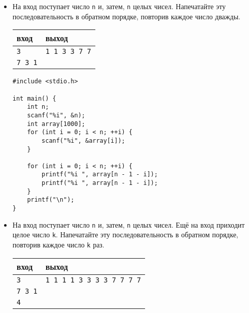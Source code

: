 \documentclass{article}
\begin{document}
\begin{itemize}
\begin{lstlisting}[backgroundcolor = \color{solcolor}]
#include <stdio.h>

int main() {
    int n;
    scanf("%i", &n);
    int array[1000];
    for (int i = 0; i < n; ++i) {
        scanf("%i", &array[i]);
    }
    
    for (int i = 0; i < n; ++i) {
        printf("%i ", array[i]);
    }
    for (int i = 0; i < n; ++i) {
        printf("%i ", array[n - 1 - i]);
    }
    printf("\n");
}
\end{lstlisting}

\item На вход поступает число \texttt{n} и, затем, \texttt{n} целых чисел. Напечатайте эту последовательность в обратном порядке, повторив каждое число дважды.
\begin{center}
\begin{tabular}{ l | l }
 вход & выход \\ \hline
 \texttt{3} & \texttt{1 1 3 3 7 7}  \\ 
 \texttt{7 3 1} &  \\ 
\end{tabular}
\end{center}

\begin{lstlisting}[backgroundcolor = \color{solcolor}]
#include <stdio.h>

int main() {
    int n;
    scanf("%i", &n);
    int array[1000];
    for (int i = 0; i < n; ++i) {
        scanf("%i", &array[i]);
    }
    
    for (int i = 0; i < n; ++i) {
        printf("%i ", array[n - 1 - i]);
        printf("%i ", array[n - 1 - i]);
    }
    printf("\n");
}
\end{lstlisting}

\item На вход поступает число \texttt{n} и, затем, \texttt{n} целых чисел. Ещё на вход приходит целое число \texttt{k}. Напечатайте эту последовательность в обратном порядке, повторив каждое число \texttt{k} раз.
\begin{center}
\begin{tabular}{ l | l }
 вход & выход \\ \hline
 \texttt{3} & \texttt{1 1 1 1 3 3 3 3 7 7 7 7}  \\ 
 \texttt{7 3 1} &  \\ 
 \texttt{4} &  \\
\end{tabular}
\end{center}


\end{itemize}
\end{document}
